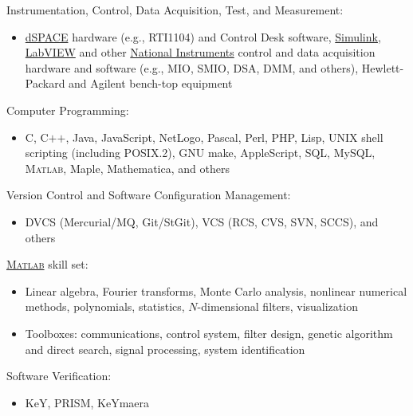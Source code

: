 \documentclass[10pt]{article}
\newenvironment{innerlist}[1][\enskip\textbullet]%
        {\begin{itemize}[#1,leftmargin=*,parsep=0pt,itemsep=0pt,topsep=0pt,partopsep=0pt]}
        {\end{itemize}}
\newcommand{\halfblankline}{\quad\vspace{-0.5\baselineskip}\pagebreak[3]}
\providecommand\Matlab{\textsc{Matlab}}
\begin{document}
\halfblankline

Instrumentation, Control, Data Acquisition, Test, and Measurement:
%
\begin{innerlist}
    \item \href{http://www.dspaceinc.com/}{dSPACE} hardware (e.g.,
        RTI1104) and Control Desk software,
        \href{http://www.mathworks.com/products/simulink/}{Simulink},
        \href{http://www.ni.com/}{LabVIEW} and other
        \href{http://www.ni.com}{National Instruments}
        control and data acquisition hardware and software (e.g., MIO,
        SMIO, DSA, DMM, and others), Hewlett-Packard and Agilent
        bench-top equipment
\end{innerlist}

\halfblankline

Computer Programming:
%
\begin{innerlist}
    \item C, C$+$$+$, Java, JavaScript, NetLogo, Pascal, Perl, PHP,
        Lisp, UNIX shell scripting (including POSIX.2), GNU make,
        AppleScript, SQL, MySQL, \Matlab, Maple, Mathematica, and others
\end{innerlist}

\halfblankline

Version Control and Software Configuration Management:
%
\begin{innerlist}
    \item DVCS (Mercurial/MQ, Git/StGit), VCS (RCS, CVS, SVN, SCCS), and
        others
\end{innerlist}

\halfblankline

\href{http://www.mathworks.com/products/matlab/}{\Matlab} skill set:
%
\begin{innerlist}
    \item Linear algebra, Fourier transforms, Monte Carlo analysis,
        nonlinear numerical methods, polynomials, statistics,
        $N$-dimensional filters, visualization

    \item Toolboxes: communications, control system, filter design,
        genetic algorithm and direct search, signal processing, system
        identification
\end{innerlist}

\halfblankline

Software Verification:
%
\begin{innerlist}
    \item KeY, PRISM, KeYmaera
\end{innerlist}
\end{document}
